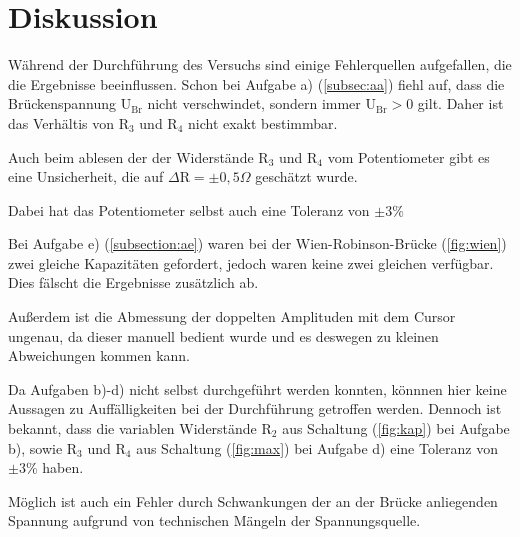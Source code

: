 \newpage
\section{Diskussion}
\label{sec:Diskussion}
Während der Durchführung des Versuchs sind einige Fehlerquellen aufgefallen, die die Ergebnisse beeinflussen.
Schon bei Aufgabe a) (\ref{subsec:aa}) fiehl auf, dass die Brückenspannung $\text{U}_\text{Br}$ nicht verschwindet,
sondern immer $\text{U}_\text{Br} > 0$ gilt. 
Daher ist das Verhältis von $\text{R}_3$ und $\text{R}_4$ nicht exakt bestimmbar.

\noindent
Auch beim ablesen der der Widerstände $\text{R}_3$ und $\text{R}_4$ vom Potentiometer gibt es eine Unsicherheit, die auf $\Delta \text{R} = \pm 0,5 \Omega$ geschätzt wurde.

\noindent
Dabei hat das Potentiometer selbst auch eine Toleranz von $\pm 3\%$

\noindent
Bei Aufgabe e) (\ref{subsection:ae}) waren bei der Wien-Robinson-Brücke (\ref{fig:wien}) zwei gleiche Kapazitäten gefordert,
jedoch waren keine zwei gleichen verfügbar. 
Dies fälscht die Ergebnisse zusätzlich ab.

\noindent
Außerdem ist die Abmessung der doppelten Amplituden mit dem Cursor ungenau, da dieser manuell bedient wurde und es deswegen zu kleinen Abweichungen kommen kann.

\noindent
Da Aufgaben b)-d) nicht selbst durchgeführt werden konnten, könnnen hier keine Aussagen zu Auffälligkeiten bei der Durchführung getroffen werden.
Dennoch ist bekannt, dass die variablen Widerstände $\text{R}_2$ aus Schaltung (\ref{fig:kap}) bei Aufgabe b), sowie $\text{R}_3$ und $\text{R}_4$ aus Schaltung (\ref{fig:max}) bei Aufgabe d) eine Toleranz von $\pm 3\%$ haben.

\noindent 
Möglich ist auch ein Fehler durch Schwankungen der an der Brücke anliegenden Spannung aufgrund von technischen Mängeln der Spannungsquelle.
